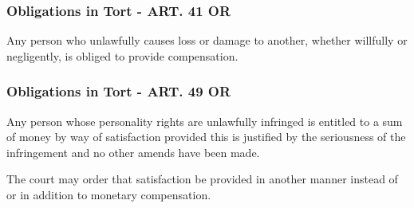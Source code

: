 \subsubsection{Obligations in Tort - ART. 41 OR}
\begin{compactenum}
	\item Any person who unlawfully causes loss or damage to another, whether willfully or negligently, is obliged to provide compensation.
\end{compactenum}

\subsubsection{Obligations in Tort - ART. 49 OR}
\begin{compactenum}
	\item Any person whose personality rights are unlawfully infringed is entitled to a	sum of money by way of satisfaction provided this is justified by the seriousness of the infringement and no other amends have been made.
	\item The court may order that satisfaction be provided in another manner instead of or in addition to monetary compensation.
\end{compactenum}